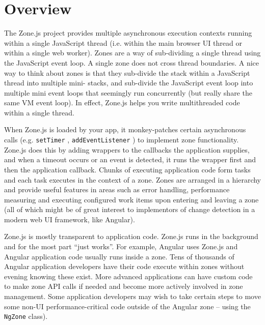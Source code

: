 \section{Overview}

The Zone.js project provides multiple asynchronous execution contexts running within
a single JavaScript thread (i.e. within the main browser UI thread or within a single
web worker). Zones are a way of sub-dividing a single thread using the JavaScript
event loop. A single zone does not cross thread boundaries. A nice way to think about
zones is that they sub-divide the stack within a JavaScript thread into multiple mini-
stacks, and sub-divide the JavaScript event loop into multiple mini event loops that
seemingly run concurrently (but really share the same VM event loop). In effect,
Zone.js helps you write multithreaded code within a single thread.

When Zone.js is loaded by your app, it monkey-patches certain asynchronous calls
(e.g.
\texttt{setTimer}
,
\texttt{addEventListener}
) to implement zone functionality. Zone.js does
this by adding wrappers to the callbacks the application supplies, and when a timeout
occurs or an event is detected, it runs the wrapper first and then the application
callback. Chunks of executing application code form tasks and each task executes in
the context of a zone. Zones are arranged in a hierarchy and provide useful features
in areas such as error handling, performance measuring and executing configured
work items upon entering and leaving a zone (all of which might be of great interest
to implementors of change detection in a modern web UI framework, like Angular).

Zone.js is mostly transparent to application code. Zone.js runs in the background and
for the most part “just works”. For example, Angular uses Zone.js and Angular
application code usually runs inside a zone. Tens of thousands of Angular application
developers have their code execute within zones without evening knowing these exist.
More advanced applications can have custom code to make zone API calls if needed
and become more actively involved in zone management. Some application
developers may wish to take certain steps to move some non-UI performance-critical
code outside of the Angular zone – using the
\texttt{NgZone}
class).


